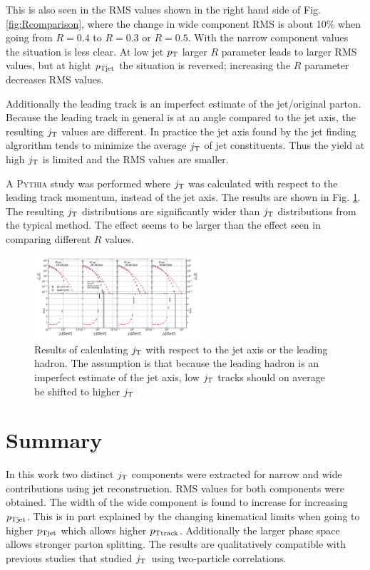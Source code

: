 This is also seen in the RMS values shown in the right hand side of Fig. \ref{fig:Rcomparison}, where the change in wide component RMS is about 10\% when going from $R=0.4$ to $R=0.3$ or $R=0.5$. With the narrow component values the situation is less clear. At low jet $p_{\rm T}$ larger $R$ parameter leads to larger RMS values, but at hight $p_{\rm Tjet}$ the situation is reversed; increasing the $R$ parameter decreases RMS values.

Additionally the leading track is an imperfect estimate of the jet/original parton. Because the leading track in general is at an angle compared to the jet axis, the resulting $j_{\rm T}$ values are different. In practice the jet axis found by the jet finding algrorithm tends to minimize the average $j_{\rm T}$ of jet constituents. Thus the yield at high $j_{\rm T}$ is limited and the RMS values are smaller.

A \textsc{Pythia} study was performed where $j_{\rm T}$ was calculated with respect to the leading track momentum, instead of the jet axis. The results are shown in Fig. \ref{fig:RefComparison}. The resulting $j_{\rm T}$ distributions are significantly wider than $j_{\rm T}$ distributions from the typical method. The effect seems to be larger than the effect seen in comparing different $R$ values.

\begin{figure}[htp]
\centering
\includegraphics[width=0.55\textwidth]{figures/results/JetVsLeadingRefConst.pdf}
\caption{Results of calculating $j_{\rm T}$ with respect to the jet axis or the leading hadron. The assumption is that because the leading hadron is an imperfect estimate of the jet axis, low $j_{\rm T}$ tracks should on average be shifted to higher $j_{\rm T}$}
\label{fig:RefComparison}
\end{figure}

\section{Summary}
\label{sec:summary}
In this work two distinct $j_{\rm T}$ components were extracted for narrow and wide contributions using jet reconstruction. RMS values for both components were obtained. The width of the wide component is found to increase for increasing $p_{\rm Tjet}$. This is in part explained by the changing kinematical limits when going to higher $p_{\rm Tjet}$ which allows higher $p_{\rm Ttrack}$. Additionally the larger phase space allows stronger parton splitting. The results are qualitatively compatible with previous studies that studied $j_{\rm T}$ using two-particle correlations.
